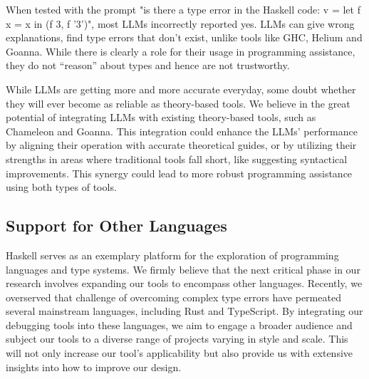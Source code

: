 When tested with the prompt "is there a type error in the Haskell code: v = let f x = x in (f 3, f '3')", most LLMs incorrectly reported yes. LLMs can give wrong explanations, find type errors that don't exist, unlike tools like GHC, Helium and Goanna. While there is clearly a role for their usage in programming assistance, they do not “reason” about types and hence are not trustworthy.

While LLMs are getting more and more accurate everyday, some doubt whether they will ever become as reliable as theory-based tools. We believe in the great potential of integrating LLMs with existing theory-based tools, such as Chameleon and Goanna. This integration could enhance the LLMs' performance by aligning their operation with accurate theoretical guides, or by utilizing their strengths in areas where traditional tools fall short, like suggesting syntactical improvements. This synergy could lead to more robust programming assistance using both types of tools.


\subsection{Support for Other Languages}
Haskell serves as an exemplary platform for the exploration of programming languages and type systems. We firmly believe that the next critical phase in our research involves expanding our tools to encompass other languages. Recently, we overserved that challenge of overcoming complex type errors have permeated several mainstream languages, including Rust and TypeScript. By integrating our debugging tools into these languages, we aim to engage a broader audience and subject our tools to a diverse range of projects varying in style and scale. This will not only increase our tool's applicability but also provide us with extensive insights into how to improve our design.

